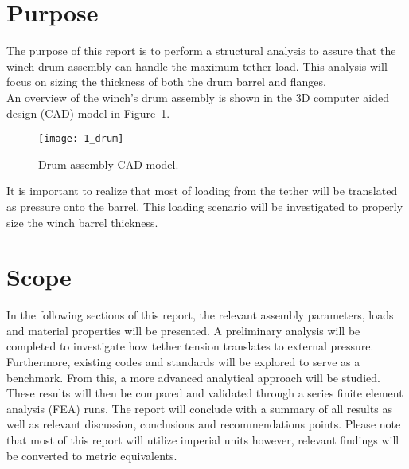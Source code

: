 \section{Purpose}

The purpose of this report is to perform a structural analysis to assure that the winch drum assembly can handle the maximum tether load. This analysis will focus on sizing the thickness of both the drum barrel and flanges.\\

An overview of the winch's drum assembly is shown in the 3D computer aided design (CAD) model \cite{INVENTOR} in Figure~\ref{fig:1_drum}.
\begin{figure}[H]
	\centering
	\texttt{[image: 1\_drum]}
	\caption{Drum assembly CAD model.}
	\label{fig:1_drum}
\end{figure}

It is important to realize that most of loading from the tether will be translated as pressure onto the barrel. This loading scenario will be investigated to properly size the winch barrel thickness.

\section{Scope}

In the following sections of this report, the relevant assembly parameters, loads and material properties will be presented. A preliminary analysis will be completed to investigate how tether tension translates to external pressure. Furthermore, existing codes and standards will be explored to serve as a benchmark. From this, a more advanced analytical approach will be studied. These results will then be compared and validated through a series finite element analysis (FEA) runs. The report will conclude with a summary of all results as  well as relevant discussion, conclusions and recommendations points. Please note that most of this report will utilize imperial units however, relevant findings will be converted to metric equivalents.